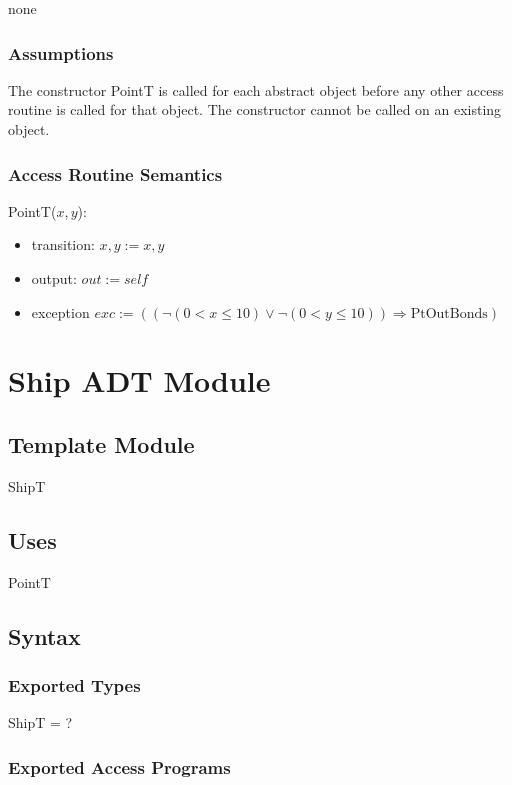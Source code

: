 \documentclass[12pt]{article}
\begin{document}
none

\subsubsection* {Assumptions}
The constructor PointT is called for each abstract object before any other access routine is called for that
object.  The constructor cannot be called on an existing object.

\subsubsection* {Access Routine Semantics}

PointT($x, y$):
\begin{itemize}
\item transition: $x, y := x, y$
\item output: $out := \mathit{self}$
\item exception
 $exc := ((\neg(0 < x \leq 10) \vee \neg(0 < y \leq 10)) \Rightarrow
\mbox{PtOutBonds})$
\end{itemize}

\newpage
\section* {Ship ADT Module}

\subsection* {Template Module}

ShipT

\subsection* {Uses}

PointT

\subsection* {Syntax}

\subsubsection* {Exported Types}

ShipT = ?

\subsubsection* {Exported Access Programs}
\end{document}
